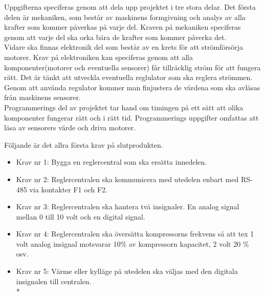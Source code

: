 Uppgifterna speciferas genom att dela upp projektet i tre stora delar. Det första delen är mekaniken, som består av maskinens formgivning och analys av alla krafter som kommer påverkas på varje del. Kraven på mekaniken speciferas genom att varje del ska orka bära de krafter som kommer påverka det.\\

Vidare ska finnas elektronik del som består av en krets för att strömförsörja motorer. Krav på elektroniken kan speciferas genom att alla komponenter(motorer och eventuella sensorer) får tillräcklig ström för att fungera rätt. Det är tänkt att utveckla eventuella reglulator som ska reglera strömmen. Genom att använda regulator kommer man finjustera de värdena som ska avläsas från maskinens sensorer.\\

Programmerings del av projektet tar hand om timingen på ett sätt att olika komponenter fungerar rätt och i rätt tid. Programmerings uppgifter omfattas att läsa av sensorers värde och driva motorer.

Följande är det allra första krav på slutprodukten.

\begin{itemize}
\item Krav nr 1: Bygga en reglercentral som ska ersätta innedelen.
\item Krav nr 2: Reglercentralen ska kommunicera med utedelen enbart med RS-485 via kontakter F1 och F2.
\item Krav nr 3: Reglercentralen ska hantera två insignaler. En analog signal mellan 0 till 10 volt och en digital signal.
\item Krav nr 4: Reglercentralen ska översätta kompressorns frekvens så att tex 1 volt analog insignal motsvarar 10\% av kompressorn kapacitet, 2 volt 20 \% osv.
\item Krav nr 5: Värme eller kylläge på utedelen ska väljas med den digitala insignalen till centralen.\\*
\end{itemize}
